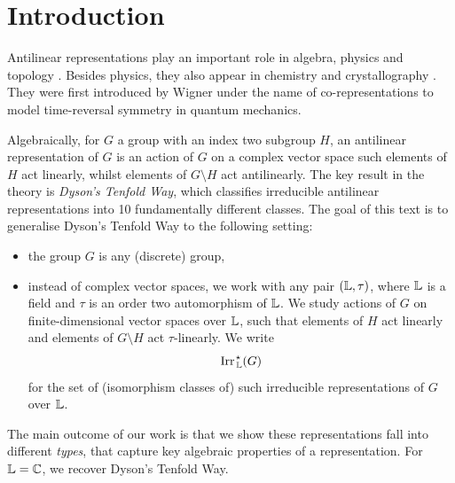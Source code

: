 \chapter*{Introduction}

Antilinear representations play an important role in algebra, physics and topology \cite{AtiSeg, AtiKtheory, NeebOlaf, DYSON, BradDav, FreMoo, TopIns, Bootstrap}. Besides physics, they also appear in chemistry and crystallography \cite{Bro, Ceulemans, JensenSaue}. They were first introduced by Wigner \cite{WIG} under the name of co-representations to model time-reversal symmetry in quantum mechanics. 

Algebraically, for $G$ a group with an index two subgroup $H$, an antilinear representation of $G$ is an action of $G$ on a complex vector space such elements of $H$ act linearly, whilst elements of $G\setminus H$ act antilinearly. The key result in the theory is {\em Dyson's Tenfold Way}, which classifies irreducible antilinear representations into 10 fundamentally different classes. The goal of this text is to generalise Dyson's Tenfold Way to the following setting:
\begin{itemize}
\item the group $G$ is any (discrete) group, 
\item instead of complex vector spaces, we work with any pair $({\mathbb L}, \tau)$, where ${\mathbb L}$ is a field and $\tau$ is an order two automorphism of ${\mathbb L}$. We study actions of $G$ on finite-dimensional vector spaces over ${\mathbb L}$, such that elements of $H$ act linearly and elements of $G \setminus H$ act $\tau$-linearly. We write
  \[ \operatorname{Irr}_{\, {\mathbb L}}^{\hspace{0.1em} \star}(G)\]
  for the set of (isomorphism classes of) such irreducible representations of $G$ over ${\mathbb L}$.
\end{itemize}

The main outcome of our work is that we show these representations fall into different {\em types}, that capture key algebraic properties of a representation. For ${\mathbb L} = {\mathbb C}$, we recover Dyson's Tenfold Way. 

